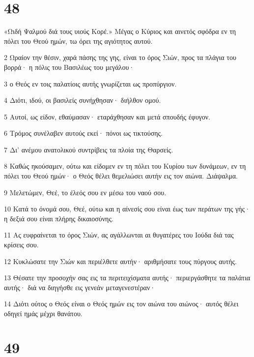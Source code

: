 \chapter{48}

\par «Ωιδή Ψαλμού διά τους υιούς Κορέ.» Μέγας ο Κύριος και αινετός σφόδρα εν τη πόλει του Θεού ημών, τω όρει της αγιότητος αυτού.
\par 2 Ωραίον την θέσιν, χαρά πάσης της γης, είναι το όρος Σιών, προς τα πλάγια του βορρά· η πόλις του Βασιλέως του μεγάλου·
\par 3 ο Θεός εν τοις παλατίοις αυτής γνωρίζεται ως προπύργιον.
\par 4 Διότι, ιδού, οι βασιλείς συνήχθησαν· διήλθον ομού.
\par 5 Αυτοί, ως είδον, εθαύμασαν· εταράχθησαν και μετά σπουδής έφυγον.
\par 6 Τρόμος συνέλαβεν αυτούς εκεί· πόνοι ως τικτούσης.
\par 7 Δι' ανέμου ανατολικού συντρίβεις τα πλοία της Θαρσείς.
\par 8 Καθώς ηκούσαμεν, ούτω και είδομεν εν τη πόλει του Κυρίου των δυνάμεων, εν τη πόλει του Θεού ημών· ο Θεός θέλει θεμελιώσει αυτήν εις τον αιώνα. Διάψαλμα.
\par 9 Μελετώμεν, Θεέ, το έλεός σου εν μέσω του ναού σου.
\par 10 Κατά το όνομά σου, Θεέ, ούτω και η αίνεσίς σου είναι έως των περάτων της γής· η δεξιά σου είναι πλήρης δικαιοσύνης.
\par 11 Ας ευφραίνεται το όρος Σιών, ας αγάλλωνται αι θυγατέρες του Ιούδα διά τας κρίσεις σου.
\par 12 Κυκλώσατε την Σιών και περιέλθετε αυτήν· αριθμήσατε τους πύργους αυτής.
\par 13 Θέσατε την προσοχήν σας εις τα περιτειχίσματα αυτής· περιεργάσθητε τα παλάτια αυτής· διά να διηγήσθε εις γενεάν μεταγενεστέραν·
\par 14 Διότι ούτος ο Θεός είναι ο Θεός ημών εις τον αιώνα του αιώνος· αυτός θέλει οδηγεί ημάς μέχρι θανάτου.

\chapter{49}

